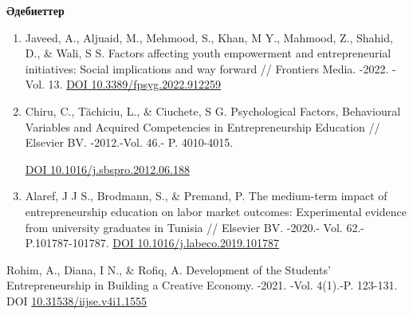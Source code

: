 \begin{center}
  {\bfseries Әдебиеттер}
  \end{center}
  
  \begin{references}

\begin{enumerate}
\def\labelenumi{\arabic{enumi}.}
\item
  Javeed, A., Aljuaid, M., Mehmood, S., Khan, M Y., Mahmood, Z., Shahid,
  D., \& Wali, S S. Factors affecting youth empowerment and
  entrepreneurial initiatives: Social implications and way forward //
  Frontiers Media. -2022. -Vol. 13.
  \href{https://doi.org/10.3389/fpsyg.2022.912259}{DOI
  10.3389/fpsyg.2022.912259}
\item
  Chiru, C., Tăchiciu, L., \& Ciuchete, S G. Psychological Factors,
  Behavioural Variables and Acquired Competencies in Entrepreneurship
  Education // Elsevier BV. -2012.-Vol. 46.- P. 4010-4015.

  \href{https://doi.org/10.1016/j.sbspro.2012.06.188}{DOI
  10.1016/j.sbspro.2012.06.188}
\item
  Alaref, J J S., Brodmann, S., \& Premand, P. The medium-term impact of
  entrepreneurship education on labor market outcomes: Experimental
  evidence from university graduates in Tunisia // Elsevier BV. -2020.-
  Vol. 62.- P.101787-101787.
  \href{https://doi.org/10.1016/j.labeco.2019.101787}{DOI
  10.1016/j.labeco.2019.101787}
\end{enumerate}

Rohim, A., Diana, I N., \& Rofiq, A. Development of the Students'
Entrepreneurship in Building a Creative Economy. -2021. -Vol. 4(1).-P.
123-131. DOI
\href{https://doi.org/10.31538/iijse.v4i1.1555}{10.31538/iijse.v4i1.1555}


\end{references}
